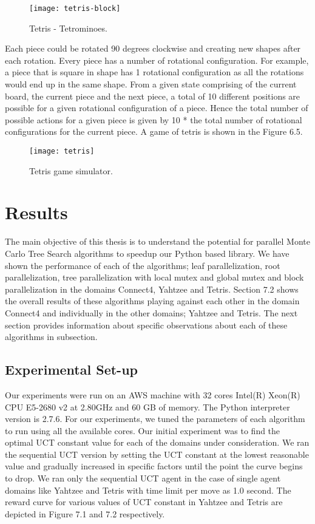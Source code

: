 \documentclass[double,12pt]{beavtex}
\begin{document}
\begin{figure}
\centering
\texttt{[image: tetris-block]}
\caption{Tetris - Tetrominoes.}
\end{figure}

Each piece could be rotated 90 degrees clockwise and creating new shapes after each rotation. Every piece has a number of rotational configuration. For example, a piece that is square in shape has 1 rotational configuration as all the rotations would end up in the same shape. From a given state comprising of the current board, the current piece and the next piece, a total of 10 different positions are possible for a given rotational configuration of a piece. Hence the total number of possible actions for a given piece is given by 10 * the total number of rotational configurations for the current piece. A game of tetris is shown in the Figure 6.5.

\begin{figure}[!ht]
\centering
\texttt{[image: tetris]}
\caption{Tetris game simulator.}
\end{figure}

\chapter{Results}
The main objective of this thesis is to understand the potential for parallel Monte Carlo Tree Search algorithms to speedup our Python based library. We have shown the performance of each of the algorithms; leaf parallelization, root parallelization, tree parallelization with local mutex and global mutex and block parallelization in the domains Connect4, Yahtzee and Tetris. Section 7.2 shows the overall results of these algorithms playing against each other in the domain Connect4 and individually in the other domains; Yahtzee and Tetris. The next section provides information about specific observations about each of these algorithms in subsection.

\section{Experimental Set-up}
Our experiments were run on an AWS machine with 32 cores Intel(R) Xeon(R) CPU E5-2680 v2 at 2.80GHz and 60 GB of memory. The Python interpreter version is 2.7.6. For our experiments, we tuned the parameters of each algorithm to run using all the available cores. Our initial experiment was to find the optimal UCT constant value for each of the domains under consideration. We ran the sequential UCT version by setting the UCT constant at the lowest reasonable value and gradually increased in specific factors until the point the curve begins to drop. We ran only the sequential UCT agent in the case of single agent domains like Yahtzee and Tetris with time limit per move as 1.0 second. The reward curve for various values of UCT constant in Yahtzee and Tetris are depicted in Figure 7.1 and 7.2 respectively.
\end{document}
